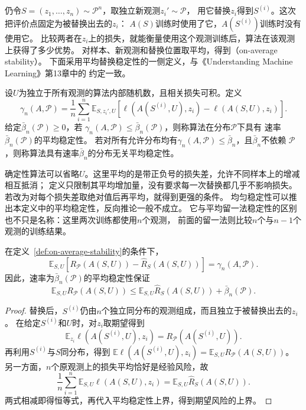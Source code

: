 仍令$S=(z_1,\ldots,z_n)\sim\mathcal P^n$，取独立新观测$z_i'\sim\mathcal P$，
用它替换$z_i$得到$S^{(i)}$。这次把评价点固定为被替换出去的$z_i$：
$A(S)$训练时使用了它，$A(S^{(i)})$训练时没有使用它。
比较两者在$z_i$上的损失，就能衡量使用这个观测训练后，算法在该观测上获得了多少优势。
对样本、新观测和替换位置取平均，得到（on-average stability）。
下面采用平均替换稳定性的一侧定义，与《Understanding Machine Learning》第13章中的
约定一致。

\begin{definition}[平均稳定性]
\label{def:on-average-stability}
设$U$为独立于所有观测的算法内部随机数，且相关损失可积。定义
\begin{equation}
 \gamma_n(A,\mathcal P)
 =\frac1n\sum_{i=1}^n\mathbb E_{S,z_i',U}
 \left[\ell(A(S^{(i)},U),z_i)-\ell(A(S,U),z_i)\right].
 \label{eq:on-average-stability}
\end{equation}
给定$\bar\beta_n(\mathcal P)\geq0$，若
$\gamma_n(A,\mathcal P)\leq\bar\beta_n(\mathcal P)$，则称算法在分布$\mathcal P$下具有
速率$\bar\beta_n(\mathcal P)$的平均稳定性。
若对所有允许分布均有$\gamma_n(A,\mathcal P)\leq\bar\beta_n$，且$\bar\beta_n$不依赖
$\mathcal P$，则称算法具有速率$\bar\beta_n$的分布无关平均稳定性。
\end{definition}

确定性算法可以省略$U$。这里平均的是带正负号的损失差，允许不同样本上的增减相互抵消；
定义只限制其平均增加量，没有要求每一次替换都几乎不影响损失。
若改为对每个损失差取绝对值后再平均，就得到更强的条件。
均匀稳定性可以推出本定义中的平均稳定性，反向推论一般不成立。
它与平均留一法稳定性的区别也不只是名称：这里两次训练都使用$n$个观测，
前面的留一法则比较$n$个与$n-1$个观测的训练结果。

\begin{theorem}[平均稳定性与期望风险]
\label{thm:on-average-generalization}
在定义~\ref{def:on-average-stability}的条件下，
\begin{equation}
 \mathbb E_{S,U}\left[R_{\mathcal P}(A(S,U))-\hat R_S(A(S,U))\right]
 =\gamma_n(A,\mathcal P).
 \label{eq:on-average-generalization-identity}
\end{equation}
因此，速率为$\bar\beta_n(\mathcal P)$的平均稳定性保证
\[
 \mathbb E_{S,U}R_{\mathcal P}(A(S,U))
 \leq\mathbb E_{S,U}\hat R_S(A(S,U))+\bar\beta_n(\mathcal P).
\]
\end{theorem}
\begin{proof}
替换后，$S^{(i)}$仍由$n$个独立同分布的观测组成，而且独立于被替换出去的$z_i$。
在给定$S^{(i)}$和$U$时，对$z_i$取期望得到
\[
 \mathbb E_{z_i}\ell(A(S^{(i)},U),z_i)
 =R_{\mathcal P}(A(S^{(i)},U)).
\]
再利用$S^{(i)}$与$S$同分布，得到
$\mathbb E\ell(A(S^{(i)},U),z_i)=\mathbb E_{S,U}R_{\mathcal P}(A(S,U))$。
另一方面，$n$个原观测上的损失平均恰好是经验风险，故
\[
 \frac1n\sum_{i=1}^n\mathbb E_{S,U}\ell(A(S,U),z_i)
 =\mathbb E_{S,U}\hat R_S(A(S,U)).
\]
两式相减即得恒等式，再代入平均稳定性上界，得到期望风险的上界。
\end{proof}

